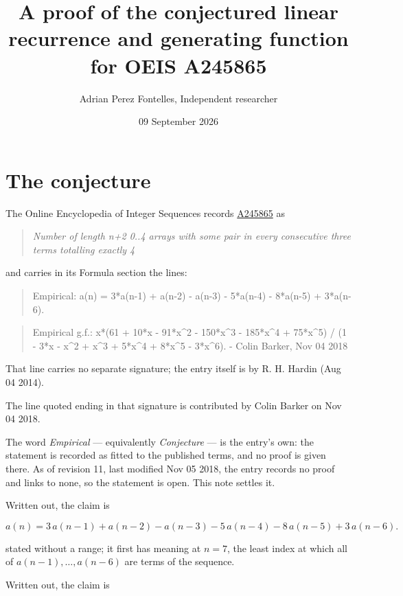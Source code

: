 \documentclass[11pt]{article}
\title{A proof of the conjectured linear recurrence and generating function for OEIS A245865}
\author{Adrian Perez Fontelles, Independent researcher}
\date{09 September 2026}
\theoremstyle{definition}
\begin{document}
\maketitle
\section{The conjecture}

The Online Encyclopedia of Integer Sequences records \href{https://oeis.org/A245865}{A245865} as

\begin{quote}\itshape Number of length n+2 0..4 arrays with some pair in every consecutive three terms totalling exactly 4\end{quote}

and carries in its Formula section the lines:

\begin{quote}\ttfamily Empirical: a(n) = 3*a(n-1) + a(n-2) - a(n-3) - 5*a(n-4) - 8*a(n-5) + 3*a(n-6).\end{quote}

\begin{quote}\ttfamily Empirical g.f.: x*(61 + 10*x - 91*x\textasciicircum{}2 - 150*x\textasciicircum{}3 - 185*x\textasciicircum{}4 + 75*x\textasciicircum{}5) / (1 - 3*x - x\textasciicircum{}2 + x\textasciicircum{}3 + 5*x\textasciicircum{}4 + 8*x\textasciicircum{}5 - 3*x\textasciicircum{}6). - Colin Barker, Nov 04 2018\end{quote}

That line carries no separate signature; the entry itself is by R. H. Hardin (Aug 04 2014).

The line quoted ending in that signature is contributed by Colin Barker on Nov 04 2018.

The word {\itshape Empirical} --- equivalently {\itshape Conjecture} --- is the entry's own: the statement is recorded as fitted to the published terms, and no proof is given there. As of revision 11, last modified Nov 05 2018, the entry records no proof and links to none, so the statement is open. This note settles it.

Written out, the claim is

\[a(n) = 3\,a(n-1) + a(n-2) - a(n-3) - 5\,a(n-4) - 8\,a(n-5) + 3\,a(n-6).\]

stated without a range; it first has meaning at $n = 7$, the least index at which all of $a(n-1),\dots,a(n-6)$ are terms of the sequence.

Written out, the claim is
\end{document}
